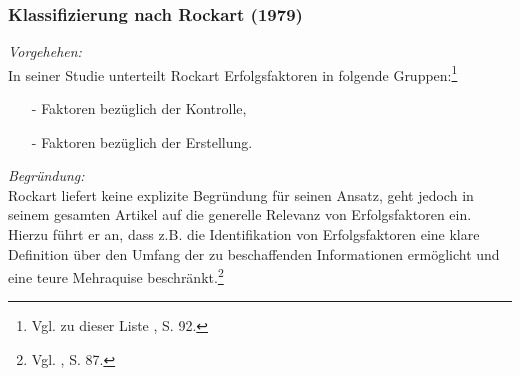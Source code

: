 \noindent
\subsubsection{Klassifizierung nach Rockart (1979)}
\textit{Vorgehehen:}\\\noindent
In seiner Studie unterteilt Rockart Erfolgsfaktoren in folgende Gruppen:\footnote{Vgl. zu dieser Liste \cite{Rockart.1979}, S. 92.}
\begin{itemize}\itemsep0pt
\item[-]Faktoren bezüglich der Kontrolle,
\item[-]Faktoren bezüglich der Erstellung.
\end{itemize}
\textit{Begründung:}\\\noindent
Rockart liefert keine explizite Begründung für seinen Ansatz, geht jedoch in seinem gesamten Artikel auf die
generelle Relevanz von Erfolgsfaktoren ein. 
Hierzu führt er an, dass z.B. die Identifikation von Erfolgsfaktoren eine klare Definition
über den Umfang der zu beschaffenden Informationen ermöglicht und eine teure Mehraquise beschränkt.\footnote{Vgl. \cite{Rockart.1979}, S. 87.}
